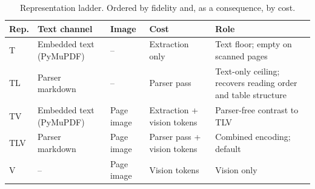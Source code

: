 \begin{table}[h]
\centering
\small
\setlength{\tabcolsep}{4pt}
\renewcommand{\arraystretch}{1.15}
\begin{tabularx}{\linewidth}{@{}
  >{\raggedright\arraybackslash}p{1.1cm}
  >{\raggedright\arraybackslash}p{3.2cm}
  >{\raggedright\arraybackslash}p{1.8cm}
  >{\raggedright\arraybackslash}p{2.6cm}
  >{\raggedright\arraybackslash}X@{}}
\toprule
Rep. & Text channel & Image & Cost & Role \\
\midrule
T   & Embedded text (PyMuPDF) & -- & Extraction only & Text floor; empty on scanned pages \\
TL  & Parser markdown & -- & Parser pass & Text-only ceiling; recovers reading order and table structure \\
TV  & Embedded text (PyMuPDF) & Page image & Extraction + vision tokens & Parser-free contrast to TLV \\
TLV & Parser markdown & Page image & Parser pass + vision tokens & Combined encoding; default \\
V   & -- & Page image & Vision tokens & Vision only \\
\bottomrule
\end{tabularx}
\caption{Representation ladder. Ordered by fidelity and, as a consequence, by cost.}
\label{tab:ladder_def}
\end{table}

